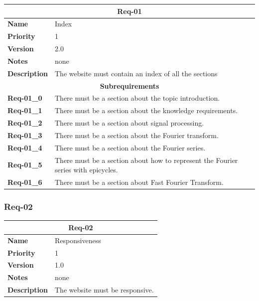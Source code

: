 \documentclass{article}
\begin{document}
\bgroup{}
\def\arraystretch{1.25}
\begin{center}
    \begin{tabular}{ |l|p{9cm}| }
        \hline
        \multicolumn{2}{|c|}{\textbf{Req-01}} \\
        \hline
        \textbf{Name} & Index \\
        \hline
        \textbf{Priority} & 1 \\
        \hline
        \textbf{Version} & 2.0 \\
        \hline
        \textbf{Notes} & none \\
        \hline
        \textbf{Description}
        & The website must contain an index of all the sections \\
        \hline
        \multicolumn{2}{|c|}{\textbf{Subrequirements}} \\
        \hline
        \textbf{Req-01\_0} & There must be a section about the topic introduction. \\
        \hline
        \textbf{Req-01\_1} & There must be a section about the knowledge requirements. \\
        \hline
        \textbf{Req-01\_2} & There must be a section about signal processing. \\
        \hline
        \textbf{Req-01\_3} & There must be a section about the Fourier transform. \\
        \hline
        \textbf{Req-01\_4} & There must be a section about the Fourier series. \\
        \hline
        \textbf{Req-01\_5} & There must be a section about how to represent the Fourier series with epicycles. \\
        \hline
        \textbf{Req-01\_6} & There must be a section about Fast Fourier Transform. \\
        \hline
    \end{tabular}
\end{center}
\egroup{}

\subsubsection{Req-02}

\bgroup{}
\def\arraystretch{1.25}
\begin{center}
    \begin{tabular}{ |l|p{9cm}| }
        \hline
        \multicolumn{2}{|c|}{\textbf{Req-02}} \\
        \hline
        \textbf{Name} & Responsiveness \\
        \hline
        \textbf{Priority} & 1 \\
        \hline
        \textbf{Version} & 1.0 \\
        \hline
        \textbf{Notes} & none \\
        \hline
        \textbf{Description}
        & The website must be responsive. \\
        \hline
    \end{tabular}
\end{center}
\egroup{}
\end{document}
